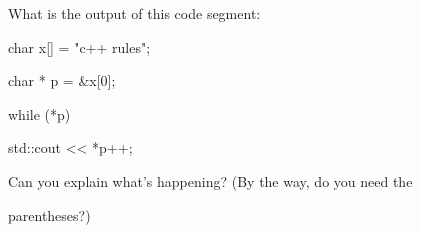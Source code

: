 What is the output of this code segment:



\begin{consolethree}[escapeinside=||]

char x[] = "c++ rules";

char * p = &x[0];

while (*p)

{

    std::cout << *p++;

}

\end{consolethree}



Can you explain what's happening? (By the way, do you need the

parentheses?)

